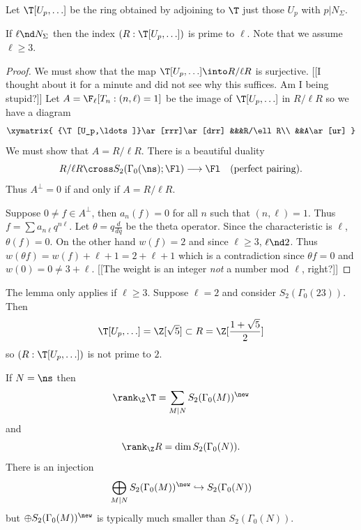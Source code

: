 \documentclass{report}
\begin{document}
Let $\T[U_p,\ldots]$ be the ring obtained by adjoining to $\T$
just those $U_p$ with $p|N_{\Sigma}$.
\begin{lemma}
  If $\ell\nd N_{\Sigma}$ then the
  index $(R:\T[U_p,\ldots])$ is prime to $\ell$.
  Note that we assume $\ell\geq 3$.
\end{lemma}
\begin{proof}
We must show that the map $\T[U_p,\ldots]\into R/\ell R$ is surjective.
[[I thought about it for a minute and did not see why this suffices. Am
I being stupid?]]
Let $A=\F_{\ell}[T_n : (n,\ell)=1]$ be the image of
$\T[U_p,\ldots]$ in $R/\ell R$ so we have a diagram
$$\xymatrix{
{\T[U_p,\ldots]}\ar[rrr]\ar[drr] &&&R/\ell R\\
               &&A\ar[ur]
}$$
We must show that $A=R/\ell R$.
There is a beautiful duality
$$R/\ell R\cross S_2(\Gamma_0(\ns);\Fl)\longrightarrow\Fl
             \quad \text{(perfect pairing)}.$$
Thus $A^{\perp}=0$ if and only if $A=R/\ell R$.

Suppose $0\neq f\in A^{\perp}$, then $a_n(f)=0$ for all $n$ such
that $(n,\ell)=1$. Thus $f=\sum a_{n\ell}q^{n\ell}$. Let
$\theta=q\frac{d}{dq}$ be the theta operator. Since the characteristic
is $\ell$, $\theta(f)=0$.
On the other hand $w(f)=2$ and since $\ell\geq 3$, $\ell\nd 2$.
Thus $w(\theta f)=w(f)+\ell+1=2+\ell+1$ which is a contradiction since
$\theta f=0$ and $w(0)=0\neq 3+\ell$.
[[The weight is an integer {\em not} a number mod $\ell$, right?]]
\end{proof}

\begin{example} The lemma only applies if $\ell\geq 3$. Suppose $\ell=2$
and consider $S_2(\Gamma_0(23))$. Then
$$\T[U_p,\ldots]=\Z[\sqrt{5}]\subset R=\Z[\frac{1+\sqrt{5}}{2}]$$
so $(R:\T[U_p,\ldots])$ is not prime to $2$.
\end{example}

\begin{remark}
If $N=\ns$ then
$$\rank_{\Z}\T=\sum_{M|N}S_2(\Gamma_0(M))^{\new}$$
and
$$\rank_{\Z} R = \dim S_2(\Gamma_0(N)).$$
There is an injection
$$\bigoplus_{M|N} S_2(\Gamma_0(M))^{\new}\hookrightarrow S_2(\Gamma_0(N))$$
but $\oplus S_2(\Gamma_0(M))^{\new}$ is typically much smaller
than $S_2(\Gamma_0(N))$.
\end{remark}
\end{document}
